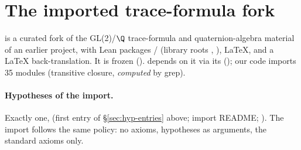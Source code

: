\section{The imported trace-formula fork}\label{sec:hyp-import}

 is a curated fork of the GL(2)/$\Q$ trace-formula and quaternion-algebra
material of an earlier project, with Lean packages / (library roots ,
), LaTeX, and a LaTeX back-translation. It is frozen ().
 depends on it via its  (); our code imports
35  modules (transitive closure, \emph{computed} by grep).

\paragraph{Hypotheses of the import.} Exactly one,  (first entry of \S\ref{sec:hyp-entries}
above; import README; ). The import follows the same policy: no axioms, hypotheses
as  arguments, the standard axioms only.

\begingroup\sloppy
